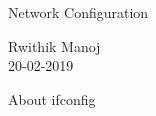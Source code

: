 \documentclass[10pt,a4paper]{report}
\begin{document}
\pagebreak
\vspace*{\fill}
\begin{center}
\begin{LARGE}
Network Configuration

\end{LARGE}
\begin{Large}
Rwithik Manoj\\
20-02-2019
\end{Large}
\end{center}
\vspace*{\fill}
\pagebreak

\begin{center}
\begin{Large}
About ifconfig
\end{Large}
\end{center}
\end{document}

